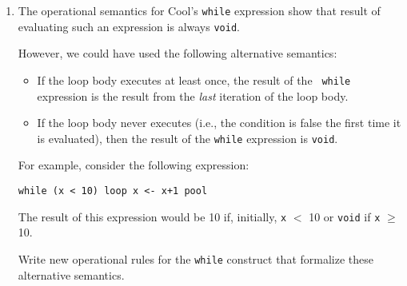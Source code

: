\documentclass[12pt]{article} \usepackage{color} \usepackage{amsmath} \usepackage{amssymb}
\begin{document}
\begin{enumerate}
{Write the operational semantics for these three syntactic constructs. You
may find it helpful to think of an array of type $T[n]$ as an object with
$n$ attributes of type $T$. 
}

\item{

The operational semantics for Cool's {\tt while} expression show that
result of evaluating such an expression is always {\tt void}.

However, we could have used the following alternative semantics:

\begin{itemize}

\item{If the loop body executes at least once, the result of the {\tt
while} expression is the result from the \emph{last} iteration of the
loop body.}

\item{If the loop body never executes (i.e., the condition is false the
first time it is evaluated), then the result of the {\tt while} expression
is {\tt void}.}

\end{itemize}

For example, consider the following expression:

\begin{lstlisting}
while (x < 10) loop x <- x+1 pool
\end{lstlisting}

The result of this expression would be 10 if, initially, {\tt x} $<$
10 or {\tt void} if {\tt x} $\geq$ 10.

Write new operational rules for the {\tt while} construct that
formalize these alternative semantics.
}



\end{enumerate}
\end{document}
